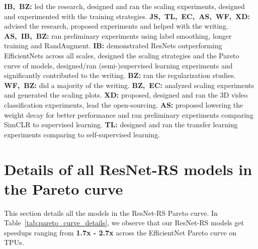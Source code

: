 \documentclass{article}
\begin{document}
\textbf{IB,~BZ:} led the research, designed and ran the scaling experiments, designed and experimented with the training strategies.
\textbf{JS,~TL,~EC,~AS,~WF,~XD:} advised the research, proposed experiments and helped with the writing.
\textbf{AS,~IB,~BZ:} ran preliminary experiments using label smoothing, longer training and RandAugment.
\textbf{IB:} demonstrated ResNets outperforming EfficientNets across all scales, designed the scaling strategies and the Pareto curve of models, designed/ran (semi-)supervised learning experiments and significantly contributed to the writing.
\textbf{BZ:} ran the regularization studies.
\textbf{WF,~BZ:} did a majority of the writing.
\textbf{BZ,~EC:} analyzed scaling experiments and generated the scaling plots.
\textbf{XD:} proposed, designed and ran the 3D video classification experiments, lead the open-sourcing.
\textbf{AS:} proposed lowering the weight decay for better performance and ran preliminary experiments comparing SimCLR to supervised learning.
\textbf{TL:} designed and ran the transfer learning experiments comparing to self-supervised learning.

\section{Details of all ResNet-RS models in the Pareto curve\label{sec:pareto_curve_details}}
This section details all the models in the ResNet-RS Pareto curve. 
In Table~\ref{tab:pareto_curve_details}, we observe that our ResNet-RS models get speedups ranging from \textbf{1.7x - 2.7x} across the EfficientNet Pareto curve on TPUs. 
\end{document}
